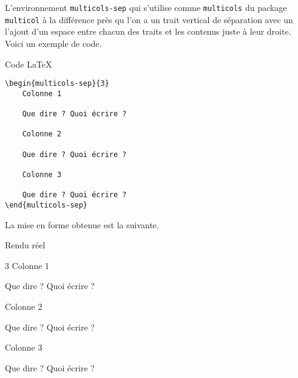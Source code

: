 L'environnement \verb+multicols-sep+ qui s'utilise comme \verb+multicols+ du package \verb+multicol+ à la différence près qu l'on a un trait vertical de séparation avec un l'ajout d'un espace entre chacun des traits et les contenus juste à leur droite.  
Voici un exemple de code.

\begin{frame-gene}{Code \LaTeX}
\small
\begin{verbatim}
\begin{multicols-sep}{3}
	Colonne 1
	
	Que dire ? Quoi écrire ?

	Colonne 2
	
	Que dire ? Quoi écrire ?

	Colonne 3

	Que dire ? Quoi écrire ?
\end{multicols-sep}
\end{verbatim}
\end{frame-gene}



\medskip

La mise en forme obtenue est la suivante.

\begin{frame-gene}{Rendu réel}
\small
\begin{multicols-sep}{3}
	Colonne 1
	
	Que dire ? Quoi écrire ?

	Colonne 2
	
	Que dire ? Quoi écrire ?

	Colonne 3

	Que dire ? Quoi écrire ?
\end{multicols-sep}
\end{frame-gene}
